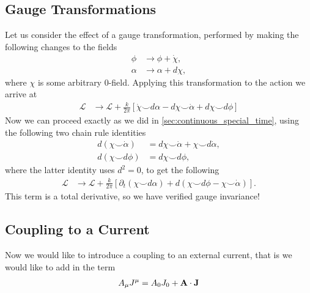 \documentclass[11pt, oneside]{article} %
\numberwithin{equation}{section}
\begin{document}
\subsection{Gauge Transformations}

Let us consider the effect of a gauge transformation, performed by making the following changes to the fields
\begin{align}
    \phi &\rightarrow \phi + \dot \chi, \\
    \alpha &\rightarrow \alpha + d\chi,
\end{align}
where $\chi$ is some arbitrary 0-field. Applying this transformation to the action we arrive at
\begin{align}
    \mathcal L &\rightarrow \mathcal L + \frac{k}{2\pi} \left [
    \dot \chi \smile d\alpha
    - d\chi \smile \dot \alpha
    + d\chi \smile d\phi
    \right]
\end{align}
Now we can proceed exactly as we did in \textsection\ref{sec:continuous_special_time}, using the following two chain rule identities
\begin{align}
    d(\chi \smile \dot \alpha) &= d\chi \smile \dot\alpha + \chi \smile d\dot\alpha, \\
    d(\chi \smile d \phi) &= d\chi\smile d \phi,
\end{align}
where the latter identity uses $d^2 = 0$, to get the following
\begin{align}
    \mathcal L &\rightarrow \mathcal L + \frac{k}{2\pi} \left [
    \partial_t(\chi\smile d\alpha)
    + d(\chi\smile d \phi - \chi\smile \dot \alpha)
    \right].
\end{align}
This term is a total derivative, so we have verified gauge invariance!

\subsection{Coupling to a Current}

Now we would like to introduce a coupling to an external current, that is we would like to add in the term
\begin{align}
    A_\mu J^\mu = A_0 J_0 + \textbf A \cdot \textbf J
\end{align}
\end{document}
